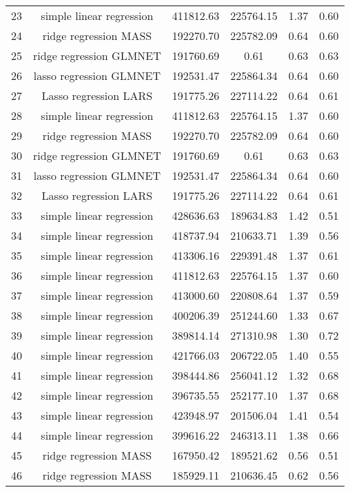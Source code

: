 \begin{tabular}{cccccc}
  23 & simple linear regression & 411812.63 & 225764.15 & 1.37 & 0.60 \\ 
  24 & ridge regression MASS & 192270.70 & 225782.09 & 0.64 & 0.60 \\ 
  25 & ridge regression GLMNET & 191760.69 & 0.61 & 0.63 & 0.63 \\ 
  26 & lasso regression GLMNET & 192531.47 & 225864.34 & 0.64 & 0.60 \\ 
  27 & Lasso regression LARS & 191775.26 & 227114.22 & 0.64 & 0.61 \\ 
  28 & simple linear regression & 411812.63 & 225764.15 & 1.37 & 0.60 \\ 
  29 & ridge regression MASS & 192270.70 & 225782.09 & 0.64 & 0.60 \\ 
  30 & ridge regression GLMNET & 191760.69 & 0.61 & 0.63 & 0.63 \\ 
  31 & lasso regression GLMNET & 192531.47 & 225864.34 & 0.64 & 0.60 \\ 
  32 & Lasso regression LARS & 191775.26 & 227114.22 & 0.64 & 0.61 \\ 
  33 & simple linear regression & 428636.63 & 189634.83 & 1.42 & 0.51 \\ 
  34 & simple linear regression & 418737.94 & 210633.71 & 1.39 & 0.56 \\ 
  35 & simple linear regression & 413306.16 & 229391.48 & 1.37 & 0.61 \\ 
  36 & simple linear regression & 411812.63 & 225764.15 & 1.37 & 0.60 \\ 
  37 & simple linear regression & 413000.60 & 220808.64 & 1.37 & 0.59 \\ 
  38 & simple linear regression & 400206.39 & 251244.60 & 1.33 & 0.67 \\ 
  39 & simple linear regression & 389814.14 & 271310.98 & 1.30 & 0.72 \\ 
  40 & simple linear regression & 421766.03 & 206722.05 & 1.40 & 0.55 \\ 
  41 & simple linear regression & 398444.86 & 256041.12 & 1.32 & 0.68 \\ 
  42 & simple linear regression & 396735.55 & 252177.10 & 1.37 & 0.68 \\ 
  43 & simple linear regression & 423948.97 & 201506.04 & 1.41 & 0.54 \\ 
  44 & simple linear regression & 399616.22 & 246313.11 & 1.38 & 0.66 \\ 
  45 & ridge regression MASS & 167950.42 & 189521.62 & 0.56 & 0.51 \\ 
  46 & ridge regression MASS & 185929.11 & 210636.45 & 0.62 & 0.56 \\ 

\end{tabular}
